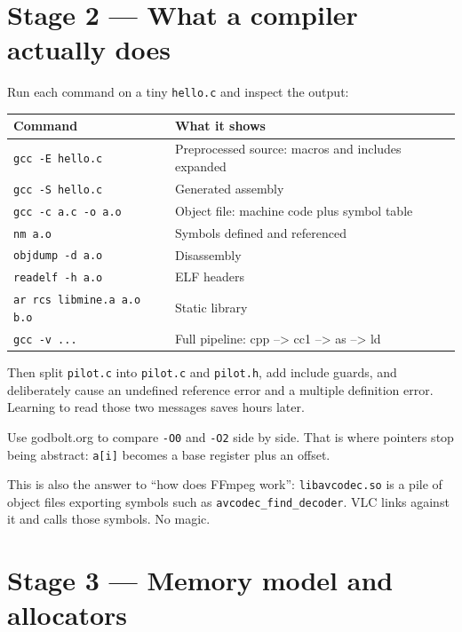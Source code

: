 \documentclass[11pt]{article}
\begin{document}
\section{Stage 2 --- What a compiler actually does}

Run each command on a tiny \texttt{hello.c} and inspect the output:

\bigskip

\begin{center}
\begin{tabular}{@{}p{} p{}@{}}
\hline
\textbf{Command} & \textbf{What it shows} \\
\hline
\texttt{gcc -E hello.c}   & Preprocessed source: macros and includes expanded \\
\texttt{gcc -S hello.c}   & Generated assembly \\
\texttt{gcc -c a.c -o a.o}& Object file: machine code plus symbol table \\
\texttt{nm a.o}           & Symbols defined and referenced \\
\texttt{objdump -d a.o}   & Disassembly \\
\texttt{readelf -h a.o}   & ELF headers \\
\texttt{ar rcs libmine.a a.o b.o} & Static library \\
\texttt{gcc -v ...}       & Full pipeline: cpp --> cc1 --> as --> ld \\
\hline
\end{tabular}
\end{center}

Then split \texttt{pilot.c} into \texttt{pilot.c} and \texttt{pilot.h}, add
include guards, and deliberately cause an undefined reference error and
a multiple definition error. Learning to read those two messages saves
hours later.

Use godbolt.org to compare \texttt{-O0} and \texttt{-O2} side by side. That is
where pointers stop being abstract: \texttt{a[i]} becomes a base register plus
an offset.

This is also the answer to ``how does FFmpeg work'': \texttt{libavcodec.so} is
a pile of object files exporting symbols such as \verb|avcodec_find_decoder|.
VLC links against it and calls those symbols. No magic.

\section{Stage 3 --- Memory model and allocators}
\end{document}
